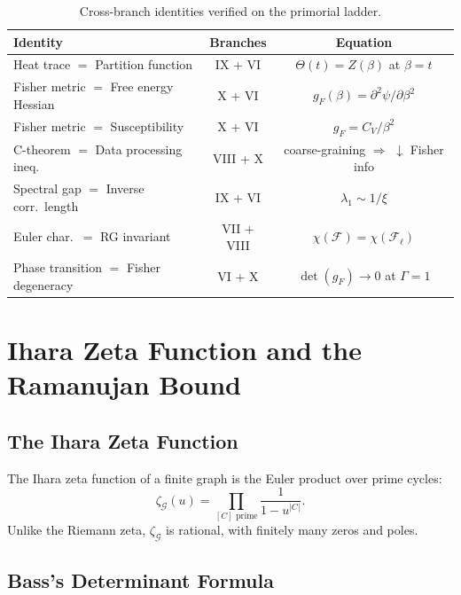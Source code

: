 \documentclass[12pt,reqno]{amsart}
\theoremstyle{plain}
\theoremstyle{definition}
\theoremstyle{remark}
\begin{document}
\begin{table}[h]
\centering
\renewcommand{\arraystretch}{1.3}
\begin{tabular}{lcc}
  \toprule
  Identity & Branches & Equation \\
  \midrule
  Heat trace $=$ Partition function
  & IX + VI & $\Theta(t) = Z(\beta)$ at $\beta = t$ \\
  Fisher metric $=$ Free energy Hessian
  & X + VI & $g_F(\beta) = \partial^2 \psi / \partial \beta^2$ \\
  Fisher metric $=$ Susceptibility
  & X + VI & $g_F = C_V / \beta^2$ \\
  C-theorem $=$ Data processing ineq.
  & VIII + X & coarse-graining $\Rightarrow$ $\downarrow$ Fisher info \\
  Spectral gap $=$ Inverse corr.\ length
  & IX + VI & $\lambda_1 \sim 1/\xi$ \\
  Euler char.\ $=$ RG invariant
  & VII + VIII & $\chi(\mathscr{F}) = \chi(\mathscr{F}_\ell)$ \\
  Phase transition $=$ Fisher degeneracy
  & VI + X & $\det(g_F) \to 0$ at $\Gamma = 1$ \\
  \bottomrule
\end{tabular}
\caption{Cross-branch identities verified on the primorial ladder.}
\label{tab:cross}
\end{table}


\section{Ihara Zeta Function and the Ramanujan Bound}%
\label{sec:ihara}

\subsection{The Ihara Zeta Function}

The Ihara zeta function of a finite graph is the Euler product over
prime cycles:
\begin{equation}\label{eq:ihara}
  \zeta_\mathcal{G}(u)
  = \prod_{[C] \text{ prime}} \frac{1}{1 - u^{|C|}}.
\end{equation}
Unlike the Riemann zeta, $\zeta_\mathcal{G}$ is rational, with
finitely many zeros and poles.

\subsection{Bass's Determinant Formula}
\end{document}
